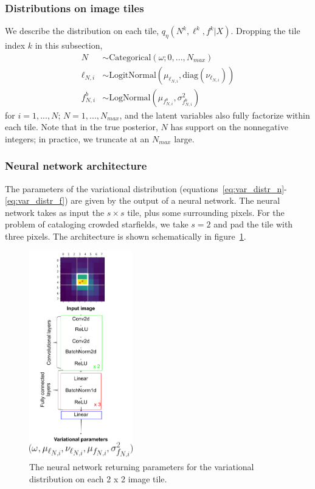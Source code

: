 \subsubsection{Distributions on image tiles}
We describe the distribution on each tile, $q_\eta(N^k, \ell^k, f^k | X)$. 
Dropping the tile index $k$ in this subsection,
\begin{align}
    N &\sim \text{Categorical}(\omega; 0, ..., N_{max}) \label{eq:var_distr_n}\\
	\ell_{N, i} &\sim \text{LogitNormal}(\mu_{\ell_{N, i}}, \text{diag}(\nu_{\ell_{N, i}}) )\label{eq:var_distr_loc}\\
	f^b_{N, i} &\sim \text{LogNormal}(\mu_{f^b_{N, i}}, \sigma^2_{f^b_{N, i}}) \label{eq:var_distr_f}
\end{align}
for $i = 1, ..., N$; $N = 1, ..., N_{max}$, and the latent variables also fully factorize within each tile. Note that in the true posterior, $N$ has support on the nonnegative integers; in practice, we truncate at an $N_{max}$ large. 

\subsubsection{Neural network architecture}
The parameters of the variational distribution (equations~\ref{eq:var_distr_n}-\ref{eq:var_distr_f}) are given by the output of a neural network. The neural network takes as input the $s \times s$ tile, plus some surrounding pixels. 
For the problem of cataloging crowded starfields, we take $s = 2$ and pad the tile with three pixels. The architecture is shown schematically in figure~\ref{fig:starnet_arch}. 

\begin{figure}[h]
    \centering
    \includegraphics[width=0.4\textwidth]{figures/starnet_archetecture2.png}
    \vspace{-0.5cm}
    \caption{The neural network returning parameters for the variational distribution on each 2 x 2 image tile.}
    \label{fig:starnet_arch}
\end{figure}

